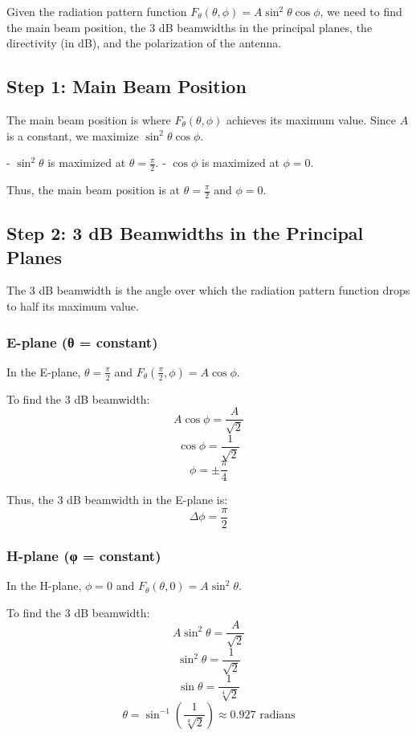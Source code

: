 \documentclass[cn,12pt]{homework}
\begin{document}
\begin{solution}


Given the radiation pattern function \( F_\theta(\theta, \phi) = A \sin^2 \theta \cos \phi \), we need to find the main beam position, the 3 dB beamwidths in the principal planes, the directivity (in dB), and the polarization of the antenna.

\subsection*{Step 1: Main Beam Position}
The main beam position is where \( F_\theta(\theta, \phi) \) achieves its maximum value. Since \( A \) is a constant, we maximize \( \sin^2 \theta \cos \phi \).

- \( \sin^2 \theta \) is maximized at \( \theta = \frac{\pi}{2} \).
- \( \cos \phi \) is maximized at \( \phi = 0 \).

Thus, the main beam position is at \( \theta = \frac{\pi}{2} \) and \( \phi = 0 \).

\subsection*{Step 2: 3 dB Beamwidths in the Principal Planes}
The 3 dB beamwidth is the angle over which the radiation pattern function drops to half its maximum value.

\subsubsection*{E-plane (θ = constant)}
In the E-plane, \( \theta = \frac{\pi}{2} \) and \( F_\theta\left(\frac{\pi}{2}, \phi\right) = A \cos \phi \).

To find the 3 dB beamwidth:
\[ A \cos \phi = \frac{A}{\sqrt{2}} \]
\[ \cos \phi = \frac{1}{\sqrt{2}} \]
\[ \phi = \pm \frac{\pi}{4} \]

Thus, the 3 dB beamwidth in the E-plane is:
\[ \Delta \phi = \frac{\pi}{2} \]

\subsubsection*{H-plane (φ = constant)}
In the H-plane, \( \phi = 0 \) and \( F_\theta(\theta, 0) = A \sin^2 \theta \).

To find the 3 dB beamwidth:
\[ A \sin^2 \theta = \frac{A}{\sqrt{2}} \]
\[ \sin^2 \theta = \frac{1}{\sqrt{2}} \]
\[ \sin \theta = \frac{1}{\sqrt[4]{2}} \]
\[ \theta = \sin^{-1}\left(\frac{1}{\sqrt[4]{2}}\right) \approx 0.927 \text{ radians} \]


\end{solution}
\end{document}
